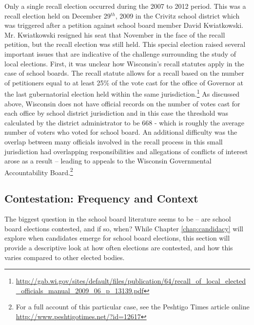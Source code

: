 Only a single recall election occurred during the 2007 to 2012 period. This was a
recall election held on December 29$^{th}$, 2009 in the Crivitz school district which 
was triggered after a petition against school board member David Kwiatkowski. Mr. Kwiatkowski 
resigned his seat that November in the face of the recall petition, but the recall 
election was still held. This special election raised several important issues that 
are indicative of the challenge surrounding the study of local elections. First, 
it was unclear how Wisconsin's recall statutes apply in the case of school boards. 
The recall statute allows for a recall based on the number of petitioners equal to 
at least 25\% of the vote cast for the office of Governor at the last gubernatorial 
election held within the same jurisdiction.\footnote{\url{http://gab.wi.gov/sites/default/files/publication/64/recall_of_local_elected_officials_manual_2009_06_p_13139.pdf}} As discussed above, Wisconsin does not 
have official records on the number of votes cast for each office by school district 
jurisdiction and in this case the threshold was calculated by the district administrator 
to be 668 - which is roughly the average number of voters who voted for school board. 
An additional difficulty was the overlap between many officials involved in the 
recall process in this small jurisdiction had overlapping responsibilities and allegations 
of conflicts of interest arose as a result -- leading to appeals to the Wisconsin 
Governmental Accountability Board.\footnote{For a full account of this 
particular case, see the Peshtigo Times article online \url{http://www.peshtigotimes.net/?id=12617}} 

\subsection{Contestation: Frequency and Context}

The biggest question in the school board literature seems to be -- are school 
board elections contested, and if so, when? While Chapter \ref{chap:candidacy} 
will explore when candidates emerge for school board elections, this section will 
provide a descriptive look at how often elections are contested, and how this varies compared to 
other elected bodies. 

